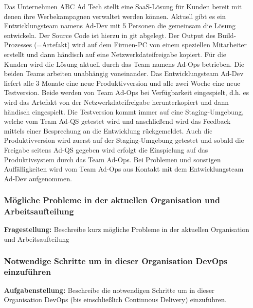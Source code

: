 Das Unternehmen ABC Ad Tech stellt eine SaaS-Lösung für Kunden bereit mit denen ihre
Werbekampagnen verwaltet werden können.
Aktuell gibt es ein Entwicklungsteam namens  Ad-Dev  mit 5 Personen die gemeinsam die
Lösung entwickeln. Der Source Code ist hierzu in git abgelegt. Der Output des Build-Prozesses
(=Artefakt) wird auf dem Firmen-PC von einem speziellen Mitarbeiter erstellt und dann
händisch auf eine Netzwerkdateifreigabe kopiert.
Für die Kunden wird die Lösung aktuell durch das Team namens Ad-Ops betrieben.
Die beiden Teams arbeiten unabhängig voneinander.
Das Entwicklungsteam Ad-Dev liefert alle 3 Monate eine neue Produktivversion und alle
zwei Woche eine neue Testversion. Beide werden von Team Ad-Ops bei Verfügbarkeit
eingespielt, d.h. es wird das Artefakt von der Netzwerkdateifreigabe herunterkopiert und dann
händisch eingespielt. Die Testversion kommt immer auf eine Staging-Umgebung, welche
vom Team Ad-QS getestet wird und anschließend wird das Feedback mittels einer
Besprechung an die Entwicklung rückgemeldet. Auch die Produktivversion wird zuerst auf der
Staging-Umgebung getestet und sobald die Freigabe seitens  Ad-QS  gegeben wird erfolgt die
Einspielung auf das Produktivsystem durch das Team Ad-Ops. Bei Problemen und sonstigen
Auffälligkeiten wird vom Team  Ad-Ops  aus Kontakt mit dem Entwicklungsteam  Ad-Dev 
aufgenommen.\\


\subsubsection{Mögliche Probleme in der aktuellen Organisation und Arbeitsaufteilung}

\textbf{Fragestellung:} Beschreibe kurz mögliche Probleme in der aktuellen Organisation und Arbeitsaufteilung
    

\subsubsection{Notwendige Schritte um in dieser Organisation DevOps einzuführen}
\textbf{Aufgabenstellung:} Beschreibe die notwendigen Schritte um in dieser Organisation DevOps (bis einschließlich
Continuous Delivery) einzuführen.

